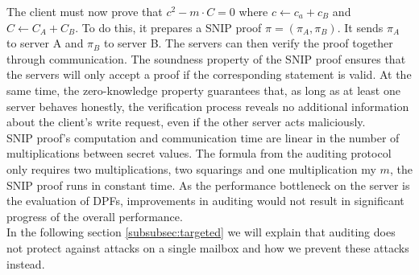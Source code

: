 \documentclass[a4paper]{article}
\begin{document}
The client must now prove that $c^2 -m \cdot C = 0$ where $c \leftarrow c_a + c_B$ and $C \leftarrow C_A + C_B$. To do this, it prepares a SNIP proof $\pi = (\pi _A, \pi _B)$. It sends $\pi _A$ to server A and $\pi _B$ to server B. The servers can then verify the proof together through communication.
The soundness property of the SNIP proof ensures that the servers will only accept a proof if the corresponding statement is valid. At the same time, the zero-knowledge property guarantees that, as long as at least one server behaves honestly, the verification process reveals no additional information about the client's write request, even if the other server acts maliciously.
\\
SNIP proof's computation and communication time are linear in the number of multiplications between secret values. The formula from the auditing protocol only requires two multiplications, two squarings and one multiplication my $m$, the SNIP proof runs in constant time. 
As the performance bottleneck on the server is the evaluation of DPFs, improvements in auditing would not result in significant progress of the overall performance.\\
In the following section \ref{subsubsec:targeted} we will explain that auditing does not protect against attacks on a single mailbox and how we prevent these attacks instead.
\end{document}
